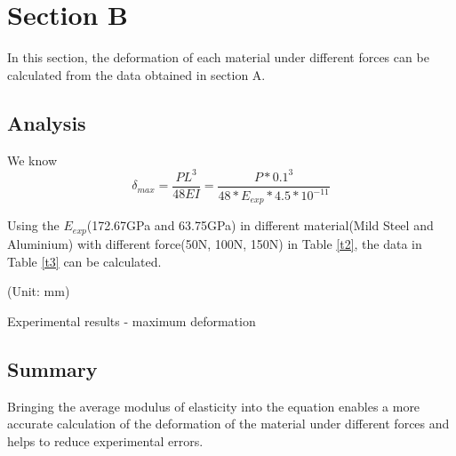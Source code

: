 \section*{Section B}
\label{sec:Section B}
\FloatBarrier %
In this section, the deformation of each material under different 
forces can be calculated from the data obtained in section A.

\subsection*{Analysis}

We know
\begin{equation} 
    \delta_{max}=\frac{PL^3}{48EI}=\frac{P*0.1^3}{48*E_{exp}*4.5*10^{-11}}
\end{equation}

Using the $E_{exp}$(172.67GPa and 63.75GPa) in different material(Mild Steel and Aluminium)
 with different force(50N, 100N, 150N) in Table \ref{t2}, the data in Table \ref{t3} can be calculated.

\begin{minipage}[htbp]{\textwidth}
    \makeatletter{}
    \centering
    
    (Unit: mm)
    \caption{Experimental results - maximum deformation}
    \label{t3} 
\end{minipage}

\subsection*{Summary}

Bringing the average modulus of elasticity into the equation enables 
a more accurate calculation of the deformation of the material under 
different forces and helps to reduce experimental errors.